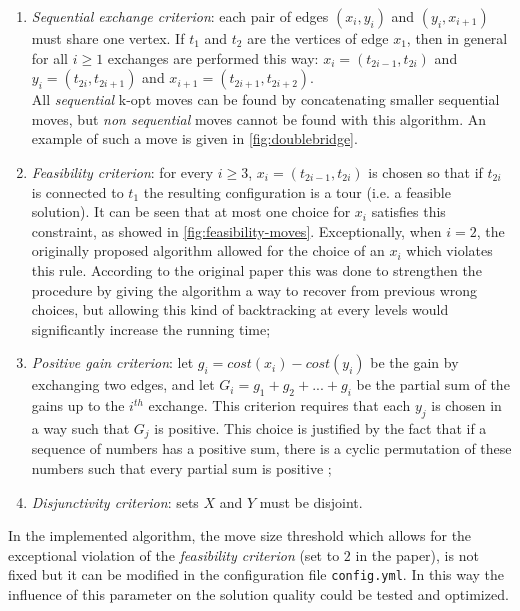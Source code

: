 \begin{enumerate}
	\item \emph{Sequential exchange criterion}: each pair of edges $(x_i, y_i)$ and $(y_i, x_{i+1})$ must share one vertex. If $t_1$ and $t_2$ are the vertices of edge $x_1$, then in general for all $i \ge 1$ exchanges are performed this way: $x_i=(t_{2i-1}, t_{2i})$ and $y_i=(t_{2i}, t_{2i+1})$ and $x_{i+1}=(t_{2i+1}, t_{2i+2})$.\\ All \emph{sequential} k-opt moves can be found by concatenating smaller sequential moves, but \emph{non sequential} moves cannot be found with this algorithm. An example of such a move is given in \cref{fig:doublebridge}.
	\item \emph{Feasibility criterion}: for every $i \ge 3$, $x_i=(t_{2i-1}, t_{2i})$ is chosen so that if $t_{2i}$ is connected to $t_1$ the resulting configuration is a tour (i.e. a feasible solution). It can be seen that at most one choice for $x_i$ satisfies this constraint, as showed in \cref{fig:feasibility-moves}. Exceptionally, when $i=2$, the originally proposed algorithm allowed for the choice of an $x_i$ which violates this rule. According to the original paper this was done to strengthen the procedure by giving the algorithm a way to recover from previous wrong choices, but allowing this kind of backtracking at every levels would significantly increase the running time;
	\item \emph{Positive gain criterion}: let $g_i=cost(x_i) - cost(y_i)$ be the gain by exchanging two edges, and let $G_i=g_1+g_2+...+g_i$ be the partial sum of the gains up to the $i^{th}$ exchange. This criterion requires that each $y_j$ is chosen in a way such that $G_j$ is positive. This choice is justified by the fact that if a sequence of numbers has a positive sum, there is a cyclic permutation of these numbers such
	that every partial sum is positive \cite{Helsgaun2000};
	\item \emph{Disjunctivity criterion}: sets $X$ and $Y$ must be disjoint. 
\end{enumerate}
In the implemented algorithm, the move size threshold which allows for the exceptional violation of the \emph{feasibility criterion} (set to $2$ in the paper), is not fixed but it can be modified in the configuration file \texttt{config.yml}. In this way the influence of this parameter on the solution quality could be tested and optimized.


